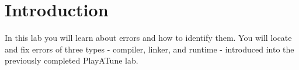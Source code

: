 \section{Introduction}
In this lab you will learn about errors and how to identify them. You will locate and fix errors of three types - compiler, linker, and runtime - introduced into the previously completed PlayATune lab.
